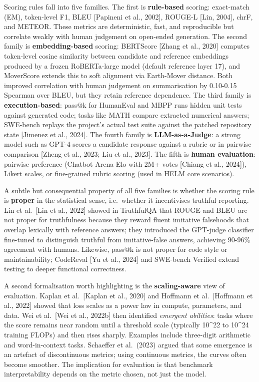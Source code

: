 Scoring rules fall into five families. The first is \textbf{rule-based} scoring: exact-match (EM), token-level F1, BLEU {[}Papineni et al., 2002{]}, ROUGE-L {[}Lin, 2004{]}, chrF, and METEOR. These metrics are deterministic, fast, and reproducible but correlate weakly with human judgement on open-ended generation. The second family is \textbf{embedding-based} scoring: BERTScore {[}Zhang et al., 2020{]} computes token-level cosine similarity between candidate and reference embeddings produced by a frozen RoBERTa-large model (default reference layer 17), and MoverScore extends this to soft alignment via Earth-Mover distance. Both improved correlation with human judgement on summarisation by 0.10-0.15 Spearman over BLEU, but they retain reference dependence. The third family is \textbf{execution-based}: pass@k for HumanEval and MBPP runs hidden unit tests against generated code; tasks like MATH compare extracted numerical answers; SWE-bench replays the project's actual test suite against the patched repository state {[}Jimenez et al., 2024{]}. The fourth family is \textbf{LLM-as-a-Judge}: a strong model such as GPT-4 scores a candidate response against a rubric or in pairwise comparison {[}Zheng et al., 2023; Liu et al., 2023{]}. The fifth is \textbf{human evaluation}: pairwise preference (Chatbot Arena Elo with 2M+ votes {[}Chiang et al., 2024{]}), Likert scales, or fine-grained rubric scoring (used in HELM core scenarios).

A subtle but consequential property of all five families is whether the scoring rule is \textbf{proper} in the statistical sense, i.e.~whether it incentivises truthful reporting. Lin et al.~{[}Lin et al., 2022{]} showed in TruthfulQA that ROUGE and BLEU are not proper for truthfulness because they reward fluent imitative falsehoods that overlap lexically with reference answers; they introduced the GPT-judge classifier fine-tuned to distinguish truthful from imitative-false answers, achieving 90-96\% agreement with humans. Likewise, pass@k is not proper for code style or maintainability; CodeReval {[}Yu et al., 2024{]} and SWE-bench Verified extend testing to deeper functional correctness.

A second formalisation worth highlighting is the \textbf{scaling-aware} view of evaluation. Kaplan et al.~{[}Kaplan et al., 2020{]} and Hoffmann et al.~{[}Hoffmann et al., 2022{]} showed that loss scales as a power law in compute, parameters, and data. Wei et al.~{[}Wei et al., 2022b{]} then identified \emph{emergent abilities}: tasks where the score remains near random until a threshold scale (typically 10\^{}22 to 10\^{}24 training FLOPs) and then rises sharply. Examples include three-digit arithmetic and word-in-context tasks. Schaeffer et al.~(2023) argued that some emergence is an artefact of discontinuous metrics; using continuous metrics, the curves often become smoother. The implication for evaluation is that benchmark interpretability depends on the metric chosen, not just the model.

